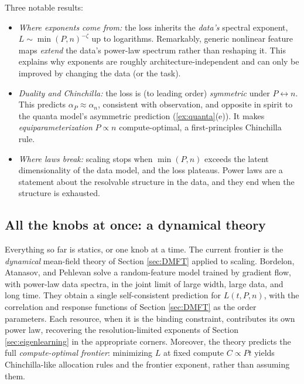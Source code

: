 \documentclass[11pt]{article}
\begin{document}
Three notable results:
%
\begin{itemize}
    \item \emph{Where exponents come from:} the loss inherits the \emph{data's} spectral exponent, $L \sim \min(P,n)^{-\zeta}$ up to logarithms. Remarkably, generic nonlinear feature maps \emph{extend} the data's power-law spectrum rather than reshaping it. This explains why exponents are roughly architecture-independent and can only be improved by changing the data (or the task).
    \item \emph{Duality and Chinchilla:} the loss is (to leading order) \emph{symmetric} under $P\leftrightarrow n$. This predicts $\alpha_P \approx \alpha_n$, consistent with observation, and opposite in spirit to the quanta model's asymmetric prediction (\cref{ex:quanta}(e)). It makes \emph{equiparameterization} $P\propto n$ compute-optimal, a first-principles Chinchilla rule.
    \item \emph{Where laws break:} scaling stops when $\min(P,n)$ exceeds the latent dimensionality of the data model, and the loss plateaus. Power laws are a statement about the resolvable structure in the data, and they end when the structure is exhausted.
\end{itemize}

\subsection{All the knobs at once: a dynamical theory}
\label{sec:scaling-dmft}

Everything so far is statics, or one knob at a time. The current frontier is the \emph{dynamical} mean-field theory of Section \ref{sec:DMFT} applied to scaling. Bordelon, Atanasov, and Pehlevan \cite{bordelon2024dynamical} solve a random-feature model trained by gradient flow, with power-law data spectra, in the joint limit of large width, large data, and long time. They obtain a single self-consistent prediction for $L(t, P, n)$, with the correlation and response functions of Section \ref{sec:DMFT} as the order parameters. Each resource, when it is the binding constraint, contributes its own power law, recovering the resolution-limited exponents of Section \ref{sec:eigenlearning} in the appropriate corners. Moreover, the theory predicts the full \emph{compute-optimal frontier}: minimizing $L$ at fixed compute $C \propto P t$ yields Chinchilla-like allocation rules and the frontier exponent, rather than assuming them.
\end{document}
